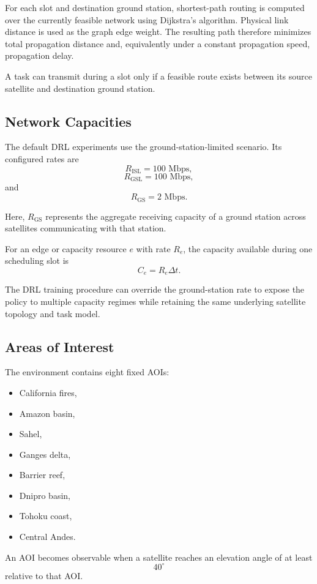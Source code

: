 \documentclass[11pt]{article}
\begin{document}
For each slot and destination ground station, shortest-path routing is
computed over the currently feasible network using Dijkstra's algorithm.
Physical link distance is used as the graph edge weight. The resulting path
therefore minimizes total propagation distance and, equivalently under a
constant propagation speed, propagation delay.

A task can transmit during a slot only if a feasible route exists between its
source satellite and destination ground station.


\subsection{Network Capacities}

The default DRL experiments use the ground-station-limited scenario. Its
configured rates are
\[
R_{\mathrm{ISL}} = 100\text{ Mbps},
\]
\[
R_{\mathrm{GSL}} = 100\text{ Mbps},
\]
and
\[
R_{\mathrm{GS}} = 2\text{ Mbps}.
\]

Here, $R_{\mathrm{GS}}$ represents the aggregate receiving capacity of a
ground station across satellites communicating with that station.

For an edge or capacity resource $e$ with rate $R_e$, the capacity available
during one scheduling slot is
\[
C_e = R_e\Delta t.
\]

The DRL training procedure can override the ground-station rate to expose the
policy to multiple capacity regimes while retaining the same underlying
satellite topology and task model.


\subsection{Areas of Interest}

The environment contains eight fixed AOIs:
\begin{itemize}
    \item California fires,
    \item Amazon basin,
    \item Sahel,
    \item Ganges delta,
    \item Barrier reef,
    \item Dnipro basin,
    \item Tohoku coast,
    \item Central Andes.
\end{itemize}

An AOI becomes observable when a satellite reaches an elevation angle of at
least
\[
40^\circ
\]
relative to that AOI.
\end{document}
